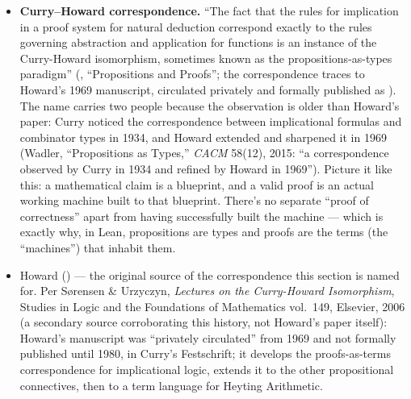 \begin{itemize}
\tightlist
\item
  \textbf{Curry--Howard correspondence.} ``The fact that the rules for implication in a proof system for natural deduction correspond exactly to the rules governing abstraction and application for functions is an instance of the Curry-Howard isomorphism, sometimes known as the propositions-as-types paradigm'' (\cite{TPIL4}, ``Propositions and Proofs''; the correspondence traces to Howard's 1969 manuscript, circulated privately and formally published as \cite{Howard1980}). The name carries two people because the observation is older than Howard's paper: Curry noticed the correspondence between implicational formulas and combinator types in 1934, and Howard extended and sharpened it in 1969 (Wadler, ``Propositions as Types,'' \emph{CACM} 58(12), 2015: ``a correspondence observed by Curry in 1934 and refined by Howard in 1969''). Picture it like this: a mathematical claim is a blueprint, and a valid proof is an actual working machine built to that blueprint. There's no separate ``proof of correctness'' apart from having successfully built the machine --- which is exactly why, in Lean, propositions are types and proofs are the terms (the ``machines'') that inhabit them.
\item
  Howard (\cite{Howard1980}) --- the original source of the correspondence this section is named for. Per Sørensen \& Urzyczyn, \emph{Lectures on the Curry-Howard Isomorphism}, Studies in Logic and the Foundations of Mathematics vol.~149, Elsevier, 2006 (a secondary source corroborating this history, not Howard's paper itself): Howard's manuscript was ``privately circulated'' from 1969 and not formally published until 1980, in Curry's Festschrift; it develops the proofs-as-terms correspondence for implicational logic, extends it to the other propositional connectives, then to a term language for Heyting Arithmetic.
\end{itemize}
